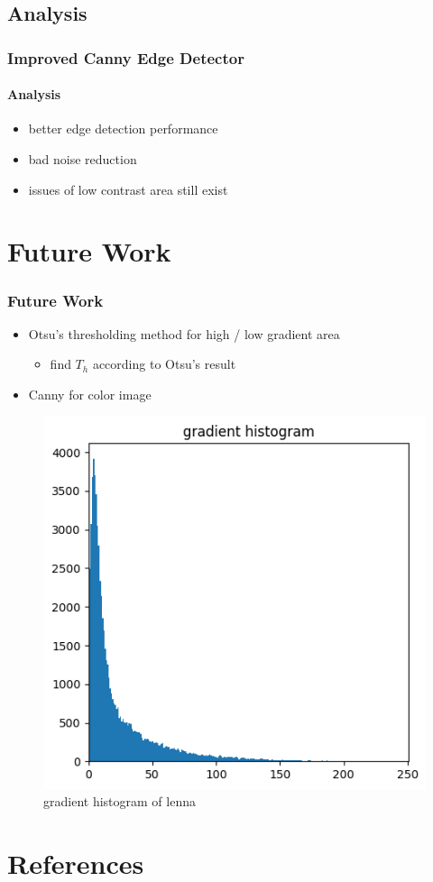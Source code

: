 \documentclass[
	11pt, %
	aspectratio=169, %
]{beamer}
\begin{document}
\subsection{Analysis}

\begin{frame}
	\frametitle{Improved Canny Edge Detector}
	\framesubtitle{Analysis}

	\begin{itemize}
		\item better edge detection performance
		\item bad noise reduction
		\item issues of low contrast area still exist
	\end{itemize}
\end{frame}

\section{Future Work}

\begin{frame}
	\frametitle{Future Work}

	\begin{itemize}
		\item Otsu’s thresholding method for high / low gradient area \cite{er2009adaptive}
		\begin{itemize}
			\item find $T_h$ according to Otsu's result
		\end{itemize}
		\item Canny for color image
	\end{itemize}
	\begin{figure}
		\includegraphics[width=0.3\linewidth]{lenna_his.png}
		\caption{gradient histogram of lenna}
	\end{figure}
\end{frame}


\section{References}
\end{document}
